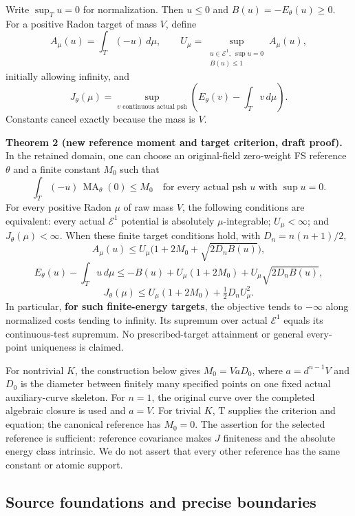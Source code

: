 \documentclass[
  11pt,
]{article}
\begin{document}
Write \(\sup_Tu=0\) for normalization. Then \(u\leq0\) and
\(B(u)=-E_\theta(u)\geq0\). For a positive Radon target of mass \(V\),
define \[
 A_\mu(u)=\int_T(-u)\,d\mu,\qquad
 U_\mu=\sup_{\substack{u\in\mathcal E^1,\ \sup u=0\\B(u)\leq1}}A_\mu(u),
\] initially allowing infinity, and \[
 J_\theta(\mu)=\sup_{v\text{ continuous actual psh}}
 \left(E_\theta(v)-\int_Tv\,d\mu\right).
\] Constants cancel exactly because the mass is \(V\).

\textbf{Theorem 2 (new reference moment and target criterion, draft
proof).} In the retained domain, one can choose an original-field
zero-weight FS reference \(\theta\) and a finite constant \(M_0\) such
that \[
 \int_T(-u)\,\operatorname{MA}_\theta(0)\leq M_0
 \quad\text{for every actual psh }u\text{ with }\sup u=0.
 \tag{2.1}
\] For every positive Radon \(\mu\) of raw mass \(V\), the following
conditions are equivalent: every actual \(\mathcal E^1\) potential is
absolutely \(\mu\)-integrable; \(U_\mu<\infty\); and
\(J_\theta(\mu)<\infty\). When these finite target conditions hold, with
\(D_n=n(n+1)/2\), \[
 A_\mu(u)\leq U_\mu\bigl(1+2M_0+\sqrt{2D_nB(u)}\bigr),
 \tag{2.2}
\] \[
 E_\theta(u)-\int_Tu\,d\mu
 \leq-B(u)+U_\mu(1+2M_0)+U_\mu\sqrt{2D_nB(u)},
 \tag{2.3}
\] \[
 J_\theta(\mu)\leq U_\mu(1+2M_0)+\tfrac12D_nU_\mu^2.
 \tag{2.4}
\] In particular, \textbf{for such finite-energy targets}, the objective
tends to \(-\infty\) along normalized costs tending to infinity. Its
supremum over actual \(\mathcal E^1\) equals its continuous-test
supremum. No prescribed-target attainment or general every-point
uniqueness is claimed.

For nontrivial \(K\), the construction below gives \(M_0=VaD_0\), where
\(a=d^{n-1}V\) and \(D_0\) is the diameter between finitely many
specified points on one fixed actual auxiliary-curve skeleton. For
\(n=1\), the original curve over the completed algebraic closure is used
and \(a=V\). For trivial \(K\), T supplies the criterion and equation;
the canonical reference has \(M_0=0\). The assertion for the selected
reference is sufficient: reference covariance makes \(J\) finiteness and
the absolute energy class intrinsic. We do not assert that every other
reference has the same constant or atomic support.

\subsection{Source foundations and precise
boundaries}\label{source-foundations-and-precise-boundaries}
\end{document}
